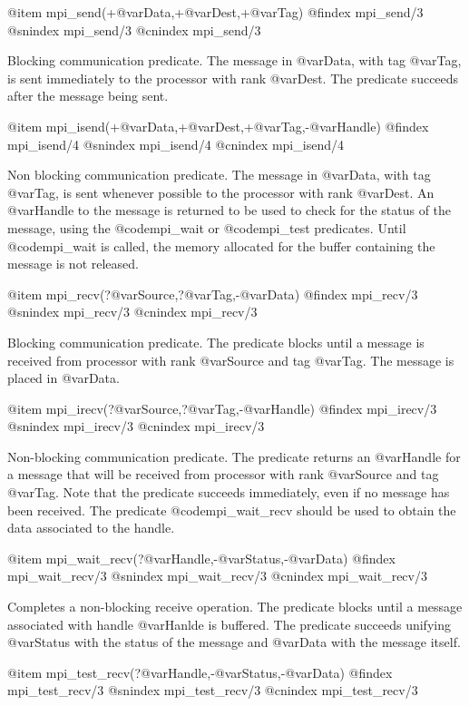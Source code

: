 {{{{{{{{{@item mpi_send(+@var{Data},+@var{Dest},+@var{Tag})
@findex mpi_send/3
@snindex mpi_send/3
@cnindex mpi_send/3

Blocking communication predicate. The message in @var{Data}, with tag
@var{Tag}, is sent immediately to the processor with rank @var{Dest}.
The predicate succeeds after the message being sent.



@item mpi_isend(+@var{Data},+@var{Dest},+@var{Tag},-@var{Handle})
@findex mpi_isend/4
@snindex mpi_isend/4
@cnindex mpi_isend/4

Non blocking communication predicate. The message in @var{Data}, with
tag @var{Tag}, is sent whenever possible to the processor with rank
@var{Dest}. An @var{Handle} to the message is returned to be used to
check for the status of the message, using the @code{mpi_wait} or
@code{mpi_test} predicates. Until @code{mpi_wait} is called, the
memory allocated for the buffer containing the message is not
released.

@item mpi_recv(?@var{Source},?@var{Tag},-@var{Data})
@findex mpi_recv/3
@snindex mpi_recv/3
@cnindex mpi_recv/3

Blocking communication predicate. The predicate blocks until a message
is received from processor with rank @var{Source} and tag @var{Tag}.
The message is placed in @var{Data}.

@item mpi_irecv(?@var{Source},?@var{Tag},-@var{Handle})
@findex mpi_irecv/3
@snindex mpi_irecv/3
@cnindex mpi_irecv/3

Non-blocking communication predicate. The predicate returns an
@var{Handle} for a message that will be received from processor with
rank @var{Source} and tag @var{Tag}. Note that the predicate succeeds
immediately, even if no message has been received. The predicate
@code{mpi_wait_recv} should be used to obtain the data associated to
the handle.

@item mpi_wait_recv(?@var{Handle},-@var{Status},-@var{Data})
@findex mpi_wait_recv/3
@snindex mpi_wait_recv/3
@cnindex mpi_wait_recv/3

Completes a non-blocking receive operation. The predicate blocks until
a message associated with handle @var{Hanlde} is buffered. The
predicate succeeds unifying @var{Status} with the status of the
message and @var{Data} with the message itself. 

@item mpi_test_recv(?@var{Handle},-@var{Status},-@var{Data})
@findex mpi_test_recv/3
@snindex mpi_test_recv/3
@cnindex mpi_test_recv/3

}}}}}}}}}
